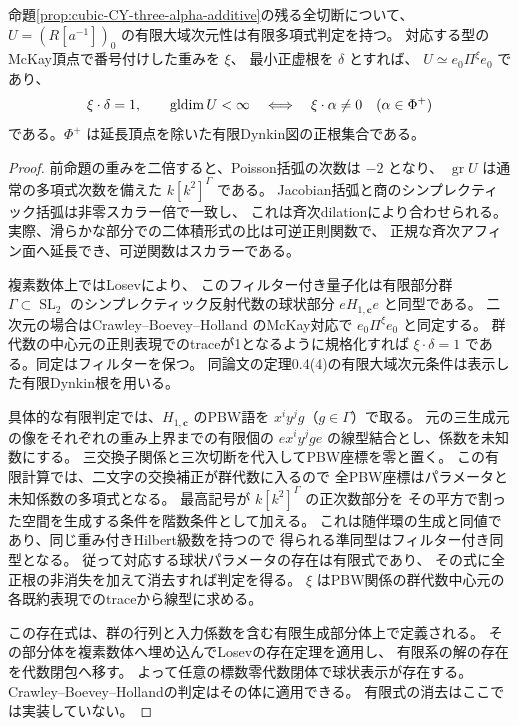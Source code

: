 \begin{proposition}\label{prop:cubic-CY-three-alpha-additive-affine-test}
命題\ref{prop:cubic-CY-three-alpha-additive}の残る全切断について、
$U=(R[a^{-1}])_0$ の有限大域次元性は有限多項式判定を持つ。
対応する型のMcKay頂点で番号付けした重みを $\xi$、
最小正虚根を $\delta$ とすれば、
$U\simeq e_0\Pi^\xi e_0$ であり、
\[
  \xi\cdot\delta=1,
  \qquad
  \operatorname{gldim} U<\infty
  \quad\Longleftrightarrow\quad
  \xi\cdot\alpha\ne0\quad(\alpha\in\Phi^+)
\]
である。$\Phi^+$ は延長頂点を除いた有限Dynkin図の正根集合である。
\end{proposition}
\begin{proof}
前命題の重みを二倍すると、Poisson括弧の次数は $-2$ となり、
$\operatorname{gr}U$ は通常の多項式次数を備えた $k[k^2]^\Gamma$ である。
Jacobian括弧と商のシンプレクティック括弧は非零スカラー倍で一致し、
これは斉次dilationにより合わせられる。
実際、滑らかな部分での二体積形式の比は可逆正則関数で、
正規な斉次アフィン面へ延長でき、可逆関数はスカラーである。

複素数体上ではLosev\cite[命題3.17]{LosevConicalQuantization}により、
このフィルター付き量子化は有限部分群
$\Gamma\subset\operatorname{SL}_2$ のシンプレクティック反射代数の球状部分
$eH_{1,\mathbf c}e$ と同型である。
二次元の場合はCrawley--Boevey--Holland
\cite[補題1.4]{CBHkleinian}のMcKay対応で $e_0\Pi^\xi e_0$ と同定する。
群代数の中心元の正則表現でのtraceが1となるように規格化すれば
$\xi\cdot\delta=1$ である。同定はフィルターを保つ。
同論文の定理0.4(4)の有限大域次元条件は表示した有限Dynkin根を用いる。

具体的な有限判定では、$H_{1,\mathbf c}$ のPBW語を
$x^iy^jg$（$g\in\Gamma$）で取る。
元の三生成元の像をそれぞれの重み上界までの有限個の
$e x^i y^j g e$ の線型結合とし、係数を未知数にする。
三交換子関係と三次切断を代入してPBW座標を零と置く。
この有限計算では、二文字の交換補正が群代数に入るので
全PBW座標はパラメータと未知係数の多項式となる。
最高記号が $k[k^2]^\Gamma$ の正次数部分を
その平方で割った空間を生成する条件を階数条件として加える。
これは随伴環の生成と同値であり、同じ重み付きHilbert級数を持つので
得られる準同型はフィルター付き同型となる。
従って対応する球状パラメータの存在は有限式であり、
その式に全正根の非消失を加えて消去すれば判定を得る。
$\xi$ はPBW関係の群代数中心元の各既約表現でのtraceから線型に求める。

この存在式は、群の行列と入力係数を含む有限生成部分体上で定義される。
その部分体を複素数体へ埋め込んでLosevの存在定理を適用し、
有限系の解の存在を代数閉包へ移す。
よって任意の標数零代数閉体で球状表示が存在する。
Crawley--Boevey--Hollandの判定はその体に適用できる。
有限式の消去はここでは実装していない。
\end{proof}


